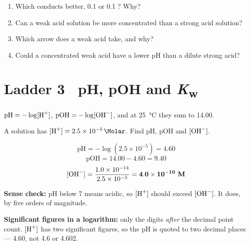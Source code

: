\documentclass{apchem-worksheet}
\begin{document}
\begin{yourturn}
\begin{enumerate}[leftmargin=*,itemsep=0.5em]
  \item Which conducts better, \SI{0.1}{\Molar}  or
        \SI{0.1}{\Molar} ? Why? \workspace[1.6cm]
  \item Can a weak acid solution be more concentrated than a strong acid
        solution? \workspace[1.6cm]
  \item Which arrow does a weak acid take, and why?
        \workspace[1.6cm]
  \item Could a concentrated weak acid have a lower pH than a dilute
        strong acid? \workspace[1.8cm]
\end{enumerate}
\end{yourturn}

\section*{\sffamily Ladder 3 \textbullet\ pH, pOH and \emph{K}\textsubscript{w}}

$\text{pH} = -\log[\ce{H+}]$, $\text{pOH} = -\log[\ce{OH-}]$, and at
\SI{25}{\celsius} they sum to \num{14.00}.

\begin{workedexample}
A solution has $[\ce{H+}] = \SI{2.5e-5}{\Molar}$. Find pH, pOH and
$[\ce{OH-}]$.

\[ \text{pH} = -\log(2.5\times10^{-5}) = \mathbf{4.60} \]
\[ \text{pOH} = 14.00 - 4.60 = \mathbf{9.40} \]
\[ [\ce{OH-}] = \frac{1.0\times10^{-14}}{2.5\times10^{-5}}
   = \mathbf{4.0\times10^{-10}~M} \]

\textbf{Sense check:} pH below 7 means acidic, so $[\ce{H+}]$ should
exceed $[\ce{OH-}]$. It does, by five orders of magnitude. \checkmark

\textbf{Significant figures in a logarithm:} only the digits \emph{after}
the decimal point count. $[\ce{H+}]$ has two significant figures, so the
pH is quoted to two decimal places --- \num{4.60}, not \num{4.6} or
\num{4.602}.
\end{workedexample}
\end{document}
